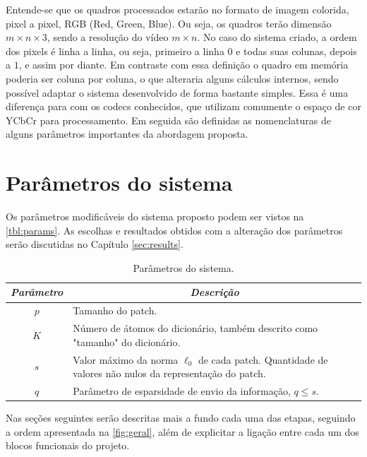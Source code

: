 \documentclass[cic,tc]{iiufrgs}
\begin{document}
Entende-se que os quadros processados estarão no formato de imagem colorida,
pixel a pixel, RGB (Red, Green, Blue). 
Ou seja, os quadros terão dimensão 
$m \times n \times 3$,
sendo a resolução do vídeo $m \times n$. 
No caso do sistema criado, a ordem dos pixels é 
linha a linha, ou seja, primeiro a linha $0$ e todas suas colunas, depois a $1$, e assim por diante.
Em contraste com essa definição o quadro em memória poderia ser coluna por coluna, o que alteraria
alguns cálculos internos, sendo possível adaptar o sistema desenvolvido de forma bastante simples.
Essa é uma diferença para com os codecs conhecidos, que utilizam comumente o espaço de cor YCbCr
para processamento.
Em seguida são definidas as nomenclaturas de alguns parâmetros importantes da abordagem proposta.

\section{Parâmetros do sistema}
Os parâmetros modificáveis do sistema proposto podem ser vistos na \autoref{tbl:params}. 
As escolhas e resultados obtidos com a alteração dos parâmetros serão discutidas no 
Capítulo \ref{sec:results}.

\begin{table}[h]
    \caption{Parâmetros do sistema.}
    \centering
        \begin{tabular}{|c|p{10cm}|}
          \hline
          \multicolumn{1}{|c|}{\textit{Parâmetro}} & 
            \multicolumn{1}{c|}{\textit{Descrição}}\\
          \hline
          \hline
          $p$    & Tamanho do patch. \\ 
          $K$    & Número de átomos do dicionário, também descrito como "tamanho" do dicionário. \\
          $s$    & Valor máximo da norma $\ell_0$ de cada patch. Quantidade de valores não nulos da representação do patch. \\     
          $q$    & Parâmetro de esparsidade de envio da informação, $q \le s$. \\
          \hline
        \end{tabular}
    \label{tbl:params}
\end{table}

Nas seções seguintes serão descritas mais a fundo cada uma das etapas, seguindo a ordem
apresentada na \autoref{fig:geral}, além de explicitar a ligação entre cada um dos blocos funcionais
do projeto.
\end{document}
